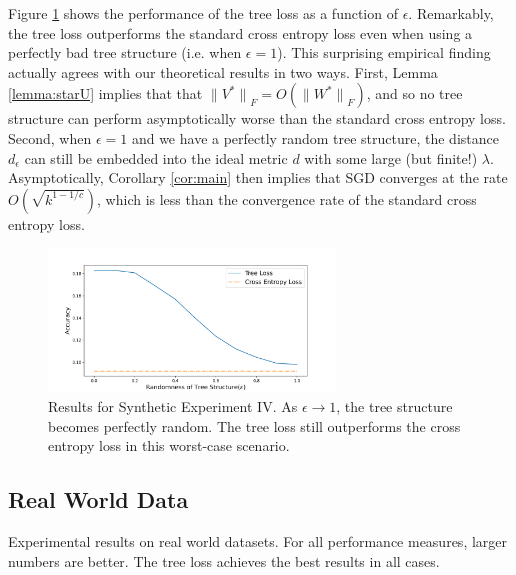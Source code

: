 \documentclass[twoside]{article}
\renewcommand{\star}[1]{{#1}^{*}}
\newcommand{\lF}[1]{{\lVert {#1} \rVert}_F}
\begin{document}
Figure \ref{fig:synth:eps} shows the performance of the tree loss as a function of $\epsilon$.
Remarkably, the tree loss outperforms the standard cross entropy loss even when using a perfectly bad tree structure (i.e. when $\epsilon=1$).
This surprising empirical finding actually agrees with our theoretical results in two ways.
First, Lemma \ref{lemma:starU} implies that that $\lF{\star V} = O(\lF{\star W})$,
and so no tree structure can perform asymptotically worse than the standard cross entropy loss.
Second, when $\epsilon=1$ and we have a perfectly random tree structure,
the distance $d_\epsilon$ can still be embedded into the ideal metric $d$ with some large (but finite!) $\lambda$.
Asymptotically, Corollary \ref{cor:main} then implies that SGD converges at the rate $O(\sqrt{k^{1-1/c}})$,
which is less than the convergence rate of the standard cross entropy loss.

\begin{figure}
\includegraphics[width=\columnwidth,height=1.5in]{fig/new_img/loss_vs_structure.png}
\caption{
Results for Synthetic Experiment IV.
As $\epsilon\to1$, 
the tree structure becomes perfectly random.
The tree loss still outperforms the cross entropy loss in this worst-case scenario.
}  
\label{fig:synth:eps}
\end{figure}




\subsection{Real World Data}

\begin{table}
    \centering
    
    \caption{Experimental results on real world datasets.  For all performance measures, larger numbers are better.  The tree loss achieves the best results in all cases.}
    \label{table:results}
\end{table}
\end{document}
